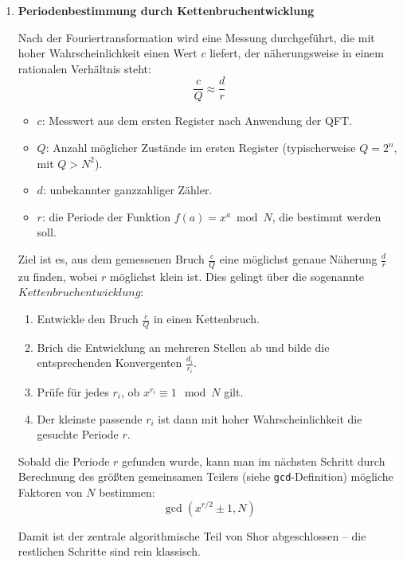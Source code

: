 {\begin{enumerate}
\noindent Genau diese Interferenzstruktur erlaubt es, verborgene Perioden zu extrahieren – und damit den entscheidenden quantenmechanischen Vorteil zur Faktorisierung auszunutzen.\\

\item \textbf{Periodenbestimmung durch Kettenbruchentwicklung}

\noindent Nach der Fouriertransformation wird eine Messung durchgeführt, die mit hoher Wahrscheinlichkeit einen Wert \( c \) liefert, der näherungsweise in einem rationalen Verhältnis steht:
\[
\frac{c}{Q} \approx \frac{d}{r}
\]

\begin{itemize}
    \item \( c \): Messwert aus dem ersten Register nach Anwendung der QFT.
    \item \( Q \): Anzahl möglicher Zustände im ersten Register (typischerweise \( Q = 2^n \), mit \( Q > N^2 \)).
    \item \( d \): unbekannter ganzzahliger Zähler.
    \item \( r \): die Periode der Funktion \( f(a) = x^a \bmod N \), die bestimmt werden soll.
\end{itemize}

\noindent Ziel ist es, aus dem gemessenen Bruch \( \frac{c}{Q} \) eine möglichst genaue Näherung \( \frac{d}{r} \) zu finden, wobei \( r \) möglichst klein ist. Dies gelingt über die sogenannte \(Kettenbruchentwicklung\):

\begin{enumerate}
    \item Entwickle den Bruch \( \frac{c}{Q} \) in einen Kettenbruch.
    \item Brich die Entwicklung an mehreren Stellen ab und bilde die entsprechenden Konvergenten \( \frac{d_i}{r_i} \).
    \item Prüfe für jedes \( r_i \), ob \( x^{r_i} \equiv 1 \mod N \) gilt.
    \item Der kleinste passende \( r_i \) ist dann mit hoher Wahrscheinlichkeit die gesuchte Periode \( r \).
\end{enumerate}

\noindent Sobald die Periode \( r \) gefunden wurde, kann man im nächsten Schritt durch Berechnung des größten gemeinsamen Teilers (siehe \texttt{gcd}-Definition) mögliche Faktoren von \( N \) bestimmen:
\[
\gcd(x^{r/2} \pm 1, N)
\]

\noindent Damit ist der zentrale algorithmische Teil von Shor abgeschlossen – die restlichen Schritte sind rein klassisch.\\
\end{enumerate}

}
